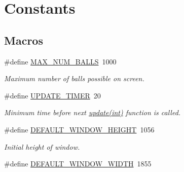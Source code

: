 \hypertarget{group___d_e_f_i_n_e}{\section{Constants}
\label{group___d_e_f_i_n_e}
}
\subsection*{Macros}
\begin{DoxyCompactItemize}
\item 
\hypertarget{group___d_e_f_i_n_e_ga9d7f8570df9132e87f4e56209206f13a}{\#define \hyperlink{group___d_e_f_i_n_e_ga9d7f8570df9132e87f4e56209206f13a}{M\-A\-X\-\_\-\-N\-U\-M\-\_\-\-B\-A\-L\-L\-S}~1000}\label{group___d_e_f_i_n_e_ga9d7f8570df9132e87f4e56209206f13a}

\begin{DoxyCompactList}\small\item\em Maximum number of balls possible on screen. \end{DoxyCompactList}\item 
\hypertarget{group___d_e_f_i_n_e_ga238c53c07c05119952391d18f00bf3bb}{\#define \hyperlink{group___d_e_f_i_n_e_ga238c53c07c05119952391d18f00bf3bb}{U\-P\-D\-A\-T\-E\-\_\-\-T\-I\-M\-E\-R}~20}\label{group___d_e_f_i_n_e_ga238c53c07c05119952391d18f00bf3bb}

\begin{DoxyCompactList}\small\item\em Minimum time before next \hyperlink{_g_u_i_8h_a9c62bb6d630b583e53331bedf18b051b}{update(int)} function is called. \end{DoxyCompactList}\item 
\hypertarget{group___d_e_f_i_n_e_ga030ebc610fddb0a18d62829ab376bf85}{\#define \hyperlink{group___d_e_f_i_n_e_ga030ebc610fddb0a18d62829ab376bf85}{D\-E\-F\-A\-U\-L\-T\-\_\-\-W\-I\-N\-D\-O\-W\-\_\-\-H\-E\-I\-G\-H\-T}~1056}\label{group___d_e_f_i_n_e_ga030ebc610fddb0a18d62829ab376bf85}

\begin{DoxyCompactList}\small\item\em Initial height of window. \end{DoxyCompactList}\item 
\hypertarget{group___d_e_f_i_n_e_ga6ca4df6b9e1495a80a2929a5187cb9b9}{\#define \hyperlink{group___d_e_f_i_n_e_ga6ca4df6b9e1495a80a2929a5187cb9b9}{D\-E\-F\-A\-U\-L\-T\-\_\-\-W\-I\-N\-D\-O\-W\-\_\-\-W\-I\-D\-T\-H}~1855}\label{group___d_e_f_i_n_e_ga6ca4df6b9e1495a80a2929a5187cb9b9}


\end{DoxyCompactItemize}

